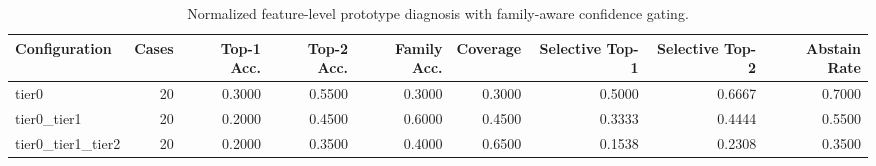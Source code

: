 \begin{table}[t]
\centering
\caption{Normalized feature-level prototype diagnosis with family-aware confidence gating.}
\label{tab:dice_stressor_hierarchical_diagnosis}
\footnotesize
\begin{tabular}{lrrrrrrrr}
\toprule
Configuration & Cases & Top-1 Acc. & Top-2 Acc. & Family Acc. & Coverage & Selective Top-1 & Selective Top-2 & Abstain Rate \\
\midrule
tier0 & 20 & 0.3000 & 0.5500 & 0.3000 & 0.3000 & 0.5000 & 0.6667 & 0.7000 \\
tier0_tier1 & 20 & 0.2000 & 0.4500 & 0.6000 & 0.4500 & 0.3333 & 0.4444 & 0.5500 \\
tier0_tier1_tier2 & 20 & 0.2000 & 0.3500 & 0.4000 & 0.6500 & 0.1538 & 0.2308 & 0.3500 \\
\bottomrule
\end{tabular}

\end{table}

